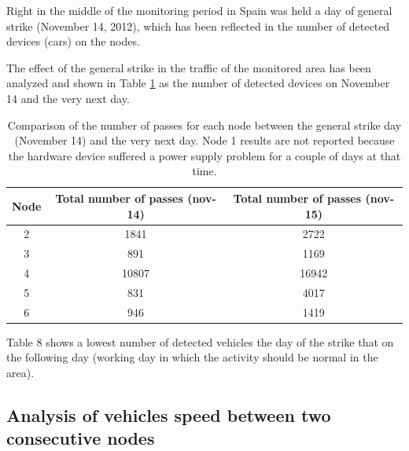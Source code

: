 \documentclass{llncs}
\begin{document}
Right in the middle of the monitoring period in Spain was held a day of general strike (November 14, 2012), which has been reflected in the number of detected devices (cars) on the nodes.

The effect of the general strike in the traffic of the monitored area has been analyzed and shown in Table \ref{huelga} as the number of detected devices on November 14 and the very next day.

 \begin{table}
 \begin{center}
 \begin{tabular}{|c|c|c|}
 \hline
 Node  &  Total number of passes (nov-14) & Total number of passes (nov-15) \\
 \hline
 2	& 1841  & 2722  \\
 \hline
 3	& 891   & 1169 \\
 \hline
 4	& 10807	& 16942 \\
 \hline
 5	& 831  	& 4017\\
 \hline
 6	& 946   & 1419 \\
 \hline
 \end{tabular}
 \end{center}
 \caption{Comparison of the number of passes for each node between the general strike day (November 14) and the very next day. Node 1 results are not reported because the hardware device suffered a power supply problem for a couple of days at that time.
 \label{huelga}}
 \end{table}

Table 8 shows a lowest number of detected vehicles the day of the strike that on the following day (working day in which the activity should be normal in the area).


\subsection{Analysis of vehicles speed between two consecutive nodes}
\end{document}
